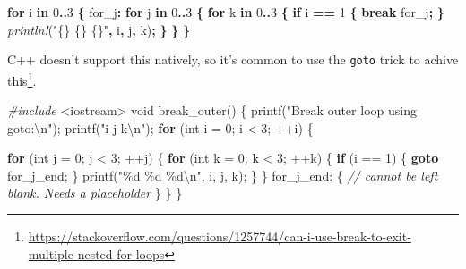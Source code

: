 \documentclass[
]{book}
\newenvironment{Shaded}{\begin{snugshade}}{\end{snugshade}}
\newcommand{\CommentTok}[1]{\textcolor[rgb]{0.56,0.35,0.01}{\textit{#1}}}
\newcommand{\ControlFlowTok}[1]{\textcolor[rgb]{0.13,0.29,0.53}{\textbf{#1}}}
\newcommand{\DataTypeTok}[1]{\textcolor[rgb]{0.13,0.29,0.53}{#1}}
\newcommand{\DecValTok}[1]{\textcolor[rgb]{0.00,0.00,0.81}{#1}}
\newcommand{\ImportTok}[1]{#1}
\newcommand{\KeywordTok}[1]{\textcolor[rgb]{0.13,0.29,0.53}{\textbf{#1}}}
\newcommand{\NormalTok}[1]{#1}
\newcommand{\OperatorTok}[1]{\textcolor[rgb]{0.81,0.36,0.00}{\textbf{#1}}}
\newcommand{\OtherTok}[1]{\textcolor[rgb]{0.56,0.35,0.01}{#1}}
\newcommand{\PreprocessorTok}[1]{\textcolor[rgb]{0.56,0.35,0.01}{\textit{#1}}}
\newcommand{\SpecialCharTok}[1]{\textcolor[rgb]{0.00,0.00,0.00}{#1}}
\newcommand{\StringTok}[1]{\textcolor[rgb]{0.31,0.60,0.02}{#1}}
\begin{document}
\begin{Shaded}
\begin{Highlighting}[]
\KeywordTok{for}\NormalTok{ i }\KeywordTok{in} \DecValTok{0}\OperatorTok{..}\DecValTok{3} \OperatorTok{\{}
    \OtherTok{\textquotesingle{}for\_j}\OperatorTok{:} \KeywordTok{for}\NormalTok{ j }\KeywordTok{in} \DecValTok{0}\OperatorTok{..}\DecValTok{3} \OperatorTok{\{}
        \KeywordTok{for}\NormalTok{ k }\KeywordTok{in} \DecValTok{0}\OperatorTok{..}\DecValTok{3} \OperatorTok{\{}
            \KeywordTok{if}\NormalTok{ i }\OperatorTok{==} \DecValTok{1} \OperatorTok{\{}
                \KeywordTok{break} \OtherTok{\textquotesingle{}for\_j}\OperatorTok{;}
            \OperatorTok{\}}
            \PreprocessorTok{println!}\NormalTok{(}\StringTok{"\{\} \{\} \{\}"}\OperatorTok{,}\NormalTok{ i}\OperatorTok{,}\NormalTok{ j}\OperatorTok{,}\NormalTok{ k)}\OperatorTok{;}
        \OperatorTok{\}}
    \OperatorTok{\}}
\OperatorTok{\}}
\end{Highlighting}
\end{Shaded}

C++ doesn't support this natively, so it's common to use the \texttt{goto} trick to achive this\footnote{\url{https://stackoverflow.com/questions/1257744/can-i-use-break-to-exit-multiple-nested-for-loops}}.

\begin{Shaded}
\begin{Highlighting}[]
\PreprocessorTok{\#include }\ImportTok{\textless{}iostream\textgreater{}}
\DataTypeTok{void}\NormalTok{ break\_outer()}
\NormalTok{\{}
\NormalTok{    printf(}\StringTok{"Break outer loop using goto:}\SpecialCharTok{\textbackslash{}n}\StringTok{"}\NormalTok{);}
\NormalTok{    printf(}\StringTok{"i j k}\SpecialCharTok{\textbackslash{}n}\StringTok{"}\NormalTok{);}
    \ControlFlowTok{for}\NormalTok{ (}\DataTypeTok{int}\NormalTok{ i = }\DecValTok{0}\NormalTok{; i \textless{} }\DecValTok{3}\NormalTok{; ++i)}
\NormalTok{    \{}

        \ControlFlowTok{for}\NormalTok{ (}\DataTypeTok{int}\NormalTok{ j = }\DecValTok{0}\NormalTok{; j \textless{} }\DecValTok{3}\NormalTok{; ++j)}
\NormalTok{        \{}
            \ControlFlowTok{for}\NormalTok{ (}\DataTypeTok{int}\NormalTok{ k = }\DecValTok{0}\NormalTok{; k \textless{} }\DecValTok{3}\NormalTok{; ++k)}
\NormalTok{            \{}
                \ControlFlowTok{if}\NormalTok{ (i == }\DecValTok{1}\NormalTok{)}
\NormalTok{                \{}
                    \ControlFlowTok{goto}\NormalTok{ for\_j\_end;}
\NormalTok{                \}}
\NormalTok{                printf(}\StringTok{"}\SpecialCharTok{\%d}\StringTok{ }\SpecialCharTok{\%d}\StringTok{ }\SpecialCharTok{\%d\textbackslash{}n}\StringTok{"}\NormalTok{, i, j, k);}
\NormalTok{            \}}
\NormalTok{        \}}
\NormalTok{    for\_j\_end:}
\NormalTok{    \{}
        \CommentTok{// cannot be left blank. Needs a placeholder}
\NormalTok{    \}}
\NormalTok{    \}}
\NormalTok{\}}
\end{Highlighting}
\end{Shaded}
\end{document}
